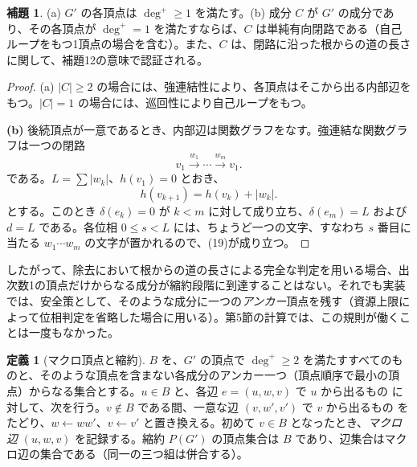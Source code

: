 \documentclass[11pt,reqno]{amsart}
\theoremstyle{definition}
\newtheorem{lemma}[theorem]{補題}
\theoremstyle{definition}
\newtheorem*{definition}{定義}
\theoremstyle{remark}
\begin{document}
\begin{samepage}
\begin{lemma}\leavevmode\label{thm:14}
(a) \(G'\) の各頂点は \(\deg^+\ge1\) を満たす。(b) 成分 \(C\) が \(G'\) の成分であり、その各頂点が \(\deg^+=1\) を満たすならば、\(C\) は単純有向閉路である（自己ループをもつ1頂点の場合を含む）。また、\(C\) は、閉路に沿った根からの道の長さに関して、補題12の意味で認証される。
\label{thm-end:14}
\end{lemma}
\end{samepage}

\begin{proof}\leavevmode\label{proof:14}
(a) \(|C|\ge2\) の場合には、強連結性により、各頂点はそこから出る内部辺をもつ。\(|C|=1\) の場合には、巡回性により自己ループをもつ。

\textbf{(b)} 後続頂点が一意であるとき、内部辺は関数グラフをなす。強連結な関数グラフは一つの閉路
\[
v_1\xrightarrow{w_1}\cdots\xrightarrow{w_m}v_1.
\]
である。\(L=\sum|w_k|\)、\(h(v_1)=0\) とおき、
\[
h(v_{k+1})=h(v_k)+|w_k|.
\]
とする。このとき \(\delta(e_k)=0\) が \(k<m\) に対して成り立ち、\(\delta(e_m)=L\) および \(d=L\) である。各位相 \(0\le s<L\) には、ちょうど一つの文字、すなわち \(s\) 番目に当たる \(w_1\cdots w_m\) の文字が置かれるので、(19)が成り立つ。\qedhere
\end{proof}

したがって、除去において根からの道の長さによる完全な判定を用いる場合、出次数1の頂点だけからなる成分が縮約段階に到達することはない。それでも実装では、安全策として、そのような成分に一つの\emph{アンカー}頂点を残す（資源上限によって位相判定を省略した場合に用いる）。第5節の計算では、この規則が働くことは一度もなかった。

\begin{definition}[マクロ頂点と縮約]
\(B\) を、\(G'\) の頂点で \(\deg^+\ge2\) を満たすすべてのものと、そのような頂点を含まない各成分のアンカー一つ（頂点順序で最小の頂点）からなる集合とする。\(u\in B\) と、各辺 \(e=(u,w,v)\) で \(u\) から出るもの に対して、次を行う。\(v\notin B\) である間、一意な辺 \((v,w',v')\) で \(v\) から出るもの をたどり、\(w\leftarrow ww'\)、\(v\leftarrow v'\) と置き換える。初めて \(v\in B\) となったとき、\emph{マクロ辺} \((u,w,v)\) を記録する。縮約 \(P(G')\) の頂点集合は \(B\) であり、辺集合はマクロ辺の集合である（同一の三つ組は併合する）。
\end{definition}
\end{document}
